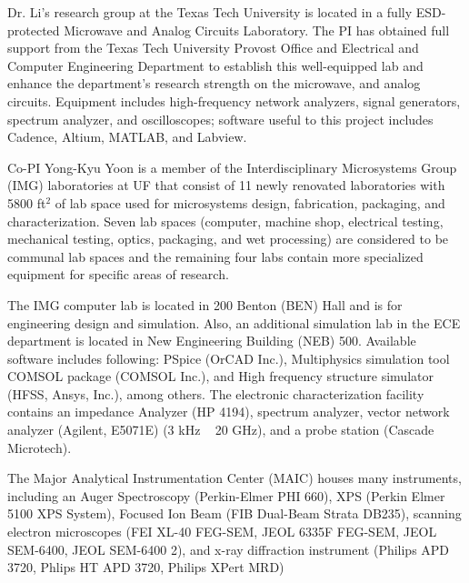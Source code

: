 Dr. Li's research group at the Texas Tech University is located in a fully ESD-protected Microwave and Analog Circuits Laboratory. The PI has obtained full support from the Texas Tech University Provost Office and Electrical and Computer Engineering Department to establish this well-equipped lab and enhance the department’s research strength on the microwave, and analog circuits. Equipment includes high-frequency network analyzers, signal generators, spectrum analyzer, and oscilloscopes; software useful to this project includes Cadence, Altium, MATLAB, and Labview.

Co-PI Yong-Kyu Yoon is a member of the Interdisciplinary Microsystems Group (IMG) laboratories at UF that consist of 11 newly renovated laboratories with 5800 ft$^2$ of lab space used for microsystems design, fabrication, packaging, and characterization.  Seven lab spaces (computer, machine shop, electrical testing, mechanical testing, optics, packaging, and wet processing) are considered to be communal lab spaces and the remaining four labs contain more specialized equipment for specific areas of research. 

The IMG computer lab is located in 200 Benton (BEN) Hall and is for engineering design and simulation. Also, an additional simulation lab in the ECE department is located in New Engineering Building (NEB) 500. Available software includes following: PSpice (OrCAD Inc.), Multiphysics simulation tool COMSOL package (COMSOL Inc.), and  High frequency structure simulator (HFSS, Ansys, Inc.), among others. The electronic characterization facility contains an impedance Analyzer (HP 4194),  spectrum analyzer,  vector network analyzer (Agilent, E5071E) (3 kHz ~ 20 GHz), and a probe station (Cascade Microtech).

The Major Analytical Instrumentation Center (MAIC) houses many instruments, including an Auger Spectroscopy (Perkin-Elmer PHI 660), XPS (Perkin Elmer 5100 XPS System), Focused Ion Beam (FIB Dual-Beam Strata DB235), scanning electron microscopes (FEI XL-40 FEG-SEM, JEOL 6335F FEG-SEM, JEOL SEM-6400, JEOL SEM-6400 2), and x-ray diffraction instrument (Philips APD 3720, Phlips HT APD 3720, Philips XPert MRD)

